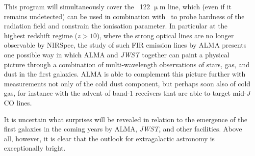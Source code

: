 This program will simultaneously cover the \NII\ 122 $\upmu\mathrm{{m}}$ line, which (even if it remains undetected) can be used in combination with \OIIILam\ to probe hardness of the radiation field and constrain the ionisation parameter. In particular at the highest redshift regime ($z > 10$), where the strong optical lines are no longer observable by NIRSpec, the study of such FIR emission lines by ALMA presents one possible way in which ALMA and \textit{JWST} together can paint a physical picture through a combination of multi-wavelength observations of stars, gas, and dust in the first galaxies. ALMA is able to complement this picture further with measurements not only of the cold dust component, but perhaps soon also of cold gas, for instance with the advent of band-1 receivers that are able to target mid-$J$ CO lines.

It is uncertain what surprises will be revealed in relation to the emergence of the first galaxies in the coming years by ALMA, \textit{JWST}, and other facilities. Above all, however, it is clear that the outlook for extragalactic astronomy is exceptionally bright.